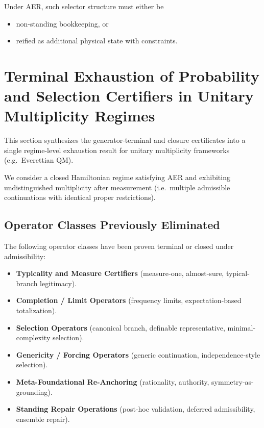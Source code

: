 \documentclass[11pt]{article}
\theoremstyle{remark}
\theoremstyle{plain}
\begin{document}
Under AER, such selector structure must either be
\begin{itemize}
\item non-standing bookkeeping, or
\item reified as additional physical state with constraints.
\end{itemize}



\section{Terminal Exhaustion of Probability and Selection Certifiers in Unitary Multiplicity Regimes}
\label{sec:terminal-exhaustion}

This section synthesizes the generator-terminal and closure certificates into a single
regime-level exhaustion result for unitary multiplicity frameworks (e.g.\ Everettian QM).

We consider a closed Hamiltonian regime satisfying AER and exhibiting
undistinguished multiplicity after measurement (i.e.\ multiple admissible
continuations with identical proper restrictions).

\subsection{Operator Classes Previously Eliminated}

The following operator classes have been proven terminal or closed under admissibility:

\begin{itemize}
\item \textbf{Typicality and Measure Certifiers} 
      (measure-one, almost-sure, typical-branch legitimacy).
\item \textbf{Completion / Limit Operators} 
      (frequency limits, expectation-based totalization).
\item \textbf{Selection Operators} 
      (canonical branch, definable representative, minimal-complexity selection).
\item \textbf{Genericity / Forcing Operators}
      (generic continuation, independence-style selection).
\item \textbf{Meta-Foundational Re-Anchoring}
      (rationality, authority, symmetry-as-grounding).
\item \textbf{Standing Repair Operations}
      (post-hoc validation, deferred admissibility, ensemble repair).
\end{itemize}
\end{document}
